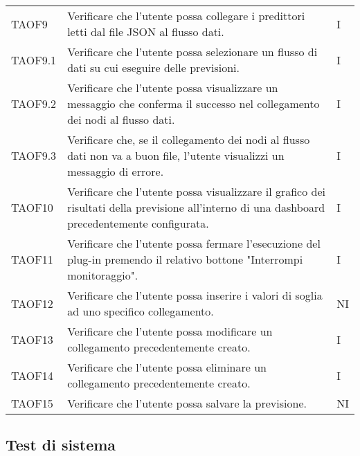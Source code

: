 \begin{longtable}{C{2.5cm} L{8cm} C{2cm}}
TAOF9 & Verificare che l’utente possa collegare i predittori letti dal file JSON al flusso dati. & I \\
TAOF9.1 & Verificare che l’utente possa selezionare un flusso di dati su cui eseguire delle previsioni. & I\\
TAOF9.2 & Verificare che l’utente possa visualizzare un messaggio che conferma il successo nel collegamento dei nodi al flusso dati. & I\\
TAOF9.3 & Verificare che, se il collegamento dei nodi al flusso dati non va a buon file, l’utente visualizzi un messaggio di errore. & I \\
TAOF10 & Verificare che l’utente possa visualizzare il grafico dei risultati della previsione all’interno di una dashboard precedentemente configurata. & I\\
TAOF11 & Verificare che l’utente possa fermare l’esecuzione del plug-in premendo il relativo bottone "Interrompi monitoraggio". & I \\
TAOF12 & Verificare che l'utente possa inserire i valori di soglia ad uno specifico collegamento. & NI \\
TAOF13 & Verificare che l'utente possa modificare un collegamento precedentemente creato. & I \\
TAOF14 & Verificare che l'utente possa eliminare un collegamento precedentemente creato. & I \\
TAOF15 & Verificare che l'utente possa salvare la previsione. & NI \\

\end{longtable}

\subsection{Test di sistema}

